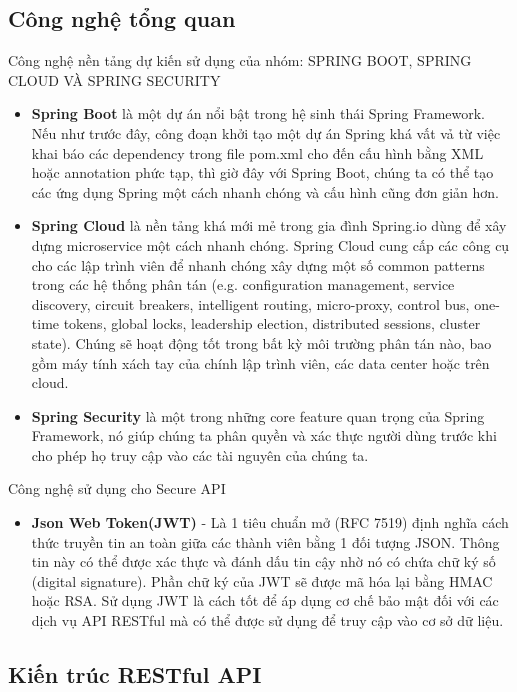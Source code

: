 		\subsection{Công nghệ tổng quan}
		Công nghệ nền tảng dự kiến sử dụng của nhóm: SPRING BOOT, SPRING CLOUD VÀ SPRING SECURITY
		\begin{itemize}
		    \item \textbf{Spring Boot} là một dự án nổi bật trong hệ sinh thái Spring Framework. Nếu như trước đây, công đoạn khởi tạo một dự án Spring khá vất vả từ việc khai báo các dependency trong file pom.xml cho đến cấu hình bằng XML hoặc annotation phức tạp, thì giờ đây với Spring Boot, chúng ta có thể tạo các ứng dụng Spring một cách nhanh chóng và cấu hình cũng đơn giản hơn.
		    \item \textbf{Spring Cloud} là nền tảng khá mới mẻ trong gia đình Spring.io dùng để xây dựng microservice một cách nhanh chóng. Spring Cloud cung cấp các công cụ cho các lập trình viên để nhanh chóng xây dựng một số common patterns trong các hệ thống phân tán (e.g. configuration management, service discovery, circuit breakers, intelligent routing, micro-proxy, control bus, one-time tokens, global locks, leadership election, distributed sessions, cluster state). Chúng sẽ hoạt động tốt trong bất kỳ môi trường phân tán nào, bao gồm máy tính xách tay của chính lập trình viên, các data center hoặc trên cloud.
		    \item \textbf{Spring Security} là một trong những core feature quan trọng của Spring Framework, nó giúp chúng ta phân quyền và xác thực người dùng trước khi cho phép họ truy cập vào các tài nguyên của chúng ta. 
		\end{itemize}
		Công nghệ sử dụng cho Secure API
		\begin{itemize}
		    \item \textbf{Json Web Token(JWT)} - Là 1 tiêu chuẩn mở (RFC 7519) định nghĩa cách thức truyền tin an toàn giữa các thành viên bằng 1 đối tượng JSON. Thông tin này có thể được xác thực và đánh dấu tin cậy nhờ nó có chứa chữ ký số (digital signature). Phần chữ ký của JWT sẽ được mã hóa lại bằng HMAC hoặc RSA. Sử dụng JWT là cách tốt để áp dụng cơ chế bảo mật đối với các dịch vụ API RESTful mà có thể được sử dụng để truy cập vào cơ sở dữ liệu.
		\end{itemize}
        \subsection{Kiến trúc RESTful API}
		    

